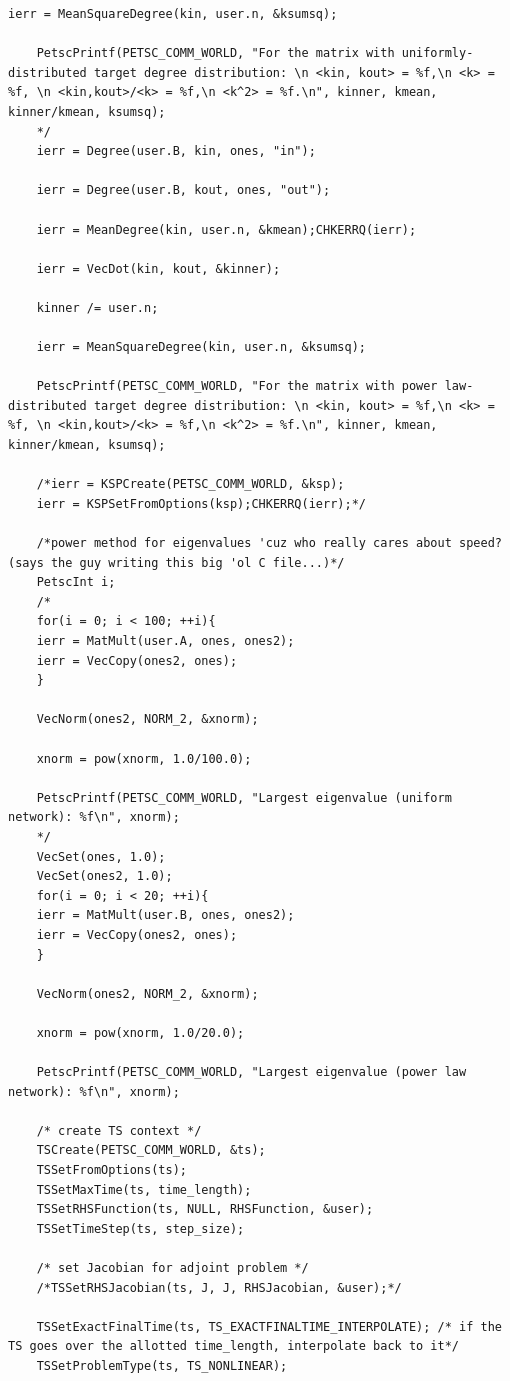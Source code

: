 \documentclass[]{article}
\begin{document}
\begin{Verbatim}[xleftmargin=-5cm]
	ierr = MeanSquareDegree(kin, user.n, &ksumsq);
	
	PetscPrintf(PETSC_COMM_WORLD, "For the matrix with uniformly-distributed target degree distribution: \n <kin, kout> = %f,\n <k> = %f, \n <kin,kout>/<k> = %f,\n <k^2> = %f.\n", kinner, kmean, kinner/kmean, ksumsq);
	*/
	ierr = Degree(user.B, kin, ones, "in");
	
	ierr = Degree(user.B, kout, ones, "out");
	
	ierr = MeanDegree(kin, user.n, &kmean);CHKERRQ(ierr);
	
	ierr = VecDot(kin, kout, &kinner);
	
	kinner /= user.n;
	
	ierr = MeanSquareDegree(kin, user.n, &ksumsq);
	
	PetscPrintf(PETSC_COMM_WORLD, "For the matrix with power law-distributed target degree distribution: \n <kin, kout> = %f,\n <k> = %f, \n <kin,kout>/<k> = %f,\n <k^2> = %f.\n", kinner, kmean, kinner/kmean, ksumsq);
	
	/*ierr = KSPCreate(PETSC_COMM_WORLD, &ksp);
	ierr = KSPSetFromOptions(ksp);CHKERRQ(ierr);*/
	
	/*power method for eigenvalues 'cuz who really cares about speed? (says the guy writing this big 'ol C file...)*/
	PetscInt i;
	/*
	for(i = 0; i < 100; ++i){
	ierr = MatMult(user.A, ones, ones2);
	ierr = VecCopy(ones2, ones);
	}
	
	VecNorm(ones2, NORM_2, &xnorm);
	
	xnorm = pow(xnorm, 1.0/100.0);
	
	PetscPrintf(PETSC_COMM_WORLD, "Largest eigenvalue (uniform network): %f\n", xnorm);
	*/
	VecSet(ones, 1.0);
	VecSet(ones2, 1.0);
	for(i = 0; i < 20; ++i){
	ierr = MatMult(user.B, ones, ones2);
	ierr = VecCopy(ones2, ones);
	}
	
	VecNorm(ones2, NORM_2, &xnorm);
	
	xnorm = pow(xnorm, 1.0/20.0);
	
	PetscPrintf(PETSC_COMM_WORLD, "Largest eigenvalue (power law network): %f\n", xnorm);
	
	/* create TS context */
	TSCreate(PETSC_COMM_WORLD, &ts);
	TSSetFromOptions(ts);
	TSSetMaxTime(ts, time_length);
	TSSetRHSFunction(ts, NULL, RHSFunction, &user);
	TSSetTimeStep(ts, step_size);
	
	/* set Jacobian for adjoint problem */
	/*TSSetRHSJacobian(ts, J, J, RHSJacobian, &user);*/
	
	TSSetExactFinalTime(ts, TS_EXACTFINALTIME_INTERPOLATE); /* if the TS goes over the allotted time_length, interpolate back to it*/
	TSSetProblemType(ts, TS_NONLINEAR);
	

\end{Verbatim}
\end{document}
